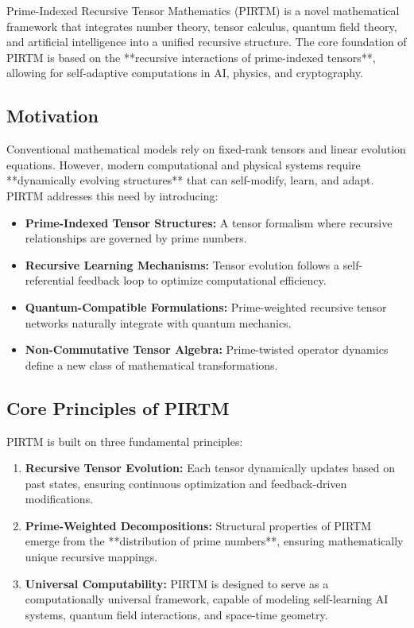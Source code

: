\documentclass{article}
\theoremstyle{plain}
\begin{document}
Prime-Indexed Recursive Tensor Mathematics (PIRTM) is a novel mathematical framework that integrates number theory, tensor calculus, quantum field theory, and artificial intelligence into a unified recursive structure. The core foundation of PIRTM is based on the **recursive interactions of prime-indexed tensors**, allowing for self-adaptive computations in AI, physics, and cryptography. 

\subsection{Motivation}
Conventional mathematical models rely on fixed-rank tensors and linear evolution equations. However, modern computational and physical systems require **dynamically evolving structures** that can self-modify, learn, and adapt. PIRTM addresses this need by introducing:
\begin{itemize}
    \item \textbf{Prime-Indexed Tensor Structures:} A tensor formalism where recursive relationships are governed by prime numbers.
    \item \textbf{Recursive Learning Mechanisms:} Tensor evolution follows a self-referential feedback loop to optimize computational efficiency.
    \item \textbf{Quantum-Compatible Formulations:} Prime-weighted recursive tensor networks naturally integrate with quantum mechanics.
    \item \textbf{Non-Commutative Tensor Algebra:} Prime-twisted operator dynamics define a new class of mathematical transformations.
\end{itemize}

\subsection{Core Principles of PIRTM}
PIRTM is built on three fundamental principles:
\begin{enumerate}
    \item \textbf{Recursive Tensor Evolution:} Each tensor dynamically updates based on past states, ensuring continuous optimization and feedback-driven modifications.
    \item \textbf{Prime-Weighted Decompositions:} Structural properties of PIRTM emerge from the **distribution of prime numbers**, ensuring mathematically unique recursive mappings.
    \item \textbf{Universal Computability:} PIRTM is designed to serve as a computationally universal framework, capable of modeling self-learning AI systems, quantum field interactions, and space-time geometry.
\end{enumerate}
\end{document}
